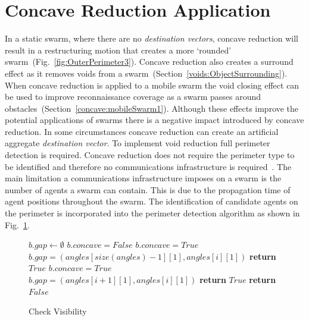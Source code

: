 \documentclass{ieeeaccess}
\begin{document}
\section{Concave Reduction Application}\label{sec:ConcaveReductionApplication}
In a static swarm, where there are no \textit{destination vectors}, concave reduction will result in a restructuring motion that creates a more `rounded' swarm~(Fig.~\ref{fig:OuterPerimeter3}). Concave reduction also creates a surround effect as it removes voids from a swarm~(Section~\ref{voids:ObjectSurrounding}). When concave reduction is applied to a mobile swarm the void closing effect can be used to improve reconnaissance coverage as a swarm passes around obstacles~(Section~\ref{concave:mobileSwarm1}).
Although these effects improve the potential applications of swarms there is a negative impact introduced by concave reduction. In some circumstances concave reduction can create an artificial aggregate \textit{destination vector}. 
To implement void reduction full perimeter detection is required. Concave reduction does not require the perimeter type to be identified and therefore no communications infrastructure is required~\cite{MD:09,NIM:09,SOM:12,ZFG:13,JG:13}. The main limitation a communications infrastructure imposes on a swarm is the number of agents a swarm can contain. This is due to the propagation time of agent positions throughout the swarm. 
The identification of candidate agents on the perimeter is incorporated into the perimeter detection algorithm as shown in Fig.~\ref{algo:checkVisibility2}.\\

\begin{figure}
\begin{algorithmic}[1]
{}
\State $b.gap \leftarrow \emptyset$
\State $b.concave = False$
\State $b.concave = True$
\State $b.gap = (angles[size(angles)-1][1],angles[i][1])$
\EndIf
   \State\textbf{return} $True$
   \EndIf
\EndIf
{}
\State $b.concave = True$\;
\State $b.gap = (angles[i + 1][1],angles[i][1])$
  \EndIf
  \State\textbf{return} $True$
\EndIf
\EndFor
\State\textbf{return} $False$
\EndProcedure
\end{algorithmic}
\caption{Check Visibility}
\label{algo:checkVisibility2}
\end{figure}
\end{document}
